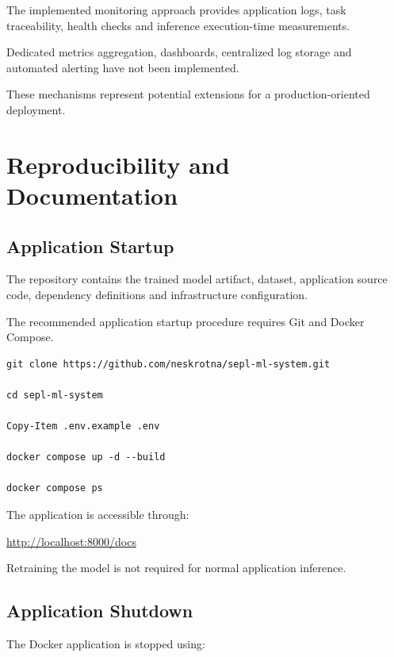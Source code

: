 \documentclass[11pt,a4paper]{article}
\begin{document}
The implemented monitoring approach provides
application logs, task traceability, health checks
and inference execution-time measurements.

Dedicated metrics aggregation, dashboards,
centralized log storage and automated alerting
have not been implemented.

These mechanisms represent potential extensions
for a production-oriented deployment.


\section{Reproducibility and Documentation}

\subsection{Application Startup}

The repository contains the trained model artifact,
dataset, application source code, dependency
definitions and infrastructure configuration.

The recommended application startup procedure
requires Git and Docker Compose.

\begin{lstlisting}
git clone https://github.com/neskrotna/sepl-ml-system.git

cd sepl-ml-system

Copy-Item .env.example .env

docker compose up -d --build

docker compose ps
\end{lstlisting}

The application is accessible through:

\begin{center}
\url{http://localhost:8000/docs}
\end{center}

Retraining the model is not required for normal
application inference.

\subsection{Application Shutdown}

The Docker application is stopped using:
\end{document}
